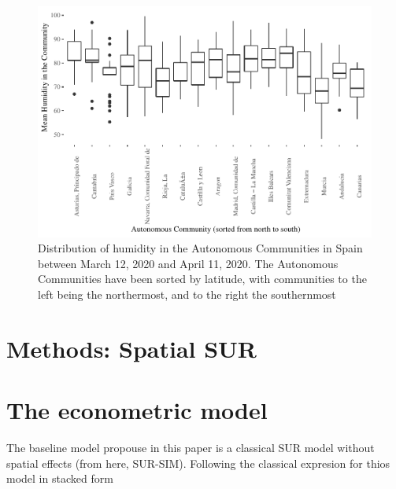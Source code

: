 \documentclass[]{elsarticle} %
\makeatletter
\def\maxwidth{\ifdim\Gin@nat@width>\linewidth\linewidth
\else\Gin@nat@width\fi}
\let\Oldincludegraphics\includegraphics
\renewcommand{\includegraphics}[1]{\Oldincludegraphics[width=\maxwidth]{#1}}
\makeatother
\begin{document}
\begin{figure}
\centering
\includegraphics{Climatic-Correlates-of-COVID19-Spain_files/figure-latex/descriptives-humidity-1.pdf}
\caption{\label{fig:descriptives-humidity} Distribution of humidity in
the Autonomous Communities in Spain between March 12, 2020 and April 11,
2020. The Autonomous Communities have been sorted by latitude, with
communities to the left being the northermost, and to the right the
southernmost}
\end{figure}

\hypertarget{methods-spatial-sur}{%
\section{Methods: Spatial SUR}\label{methods-spatial-sur}}

\hypertarget{the-econometric-model}{%
\section{The econometric model}\label{the-econometric-model}}

The baseline model propouse in this paper is a classical SUR model
without spatial effects (from here, SUR-SIM). Following the classical
expresion for thios model in stacked form
\end{document}
